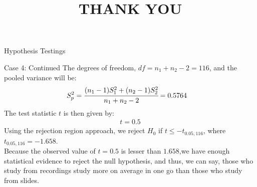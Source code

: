 \documentclass{beamer}
\begin{document}
\begin{frame}{Hypothesis Testings}
\begin{block}{Case 4: Continued}
The degrees of freedom, $df = n_1 + n_2 -2 = 116$, and the pooled variance will be:
 \begin{align}
     S_p^2 &= \cfrac{(n_1-1)S_1^2 + (n_2-1)S_2^2}{n_1+n_2-2} = 0.5764
 \end{align}
The test statistic $t$ is then given by:
\begin{align}
      t = 0.5
 \end{align}
Using the rejection region approach, we reject $H_0$ if $t \leq -t_{0.05, 116}$, where $t_{0.05,116} = -1.658$.\\ 
Because the observed value of $t=0.5$ is lesser than $1.658$,we have enough statistical evidence to reject the null hypothesis, and thus, we can say, those who study from recordings study more on average in one go than those who study from slides.
\end{block}
\end{frame}

\title{THANK YOU}
\author[]{}
\begin{frame}
    \maketitle
\end{frame}
\end{document}
